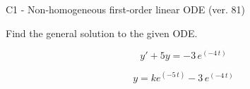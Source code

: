 \begin{exercise}
  \begin{exerciseTitle}C1 - Non-homogeneous first-order linear ODE (ver. 81)\end{exerciseTitle}
  \begin{exerciseStatement}
    
Find the general solution to the given ODE.

    
\[y'+5y= -3 \, e^{\left(-4 \, t\right)}\]

  \end{exerciseStatement}
  \begin{exerciseAnswer}
    
\[y= k e^{\left(-5 \, t\right)} - 3 \, e^{\left(-4 \, t\right)}\]

  \end{exerciseAnswer}
\end{exercise}